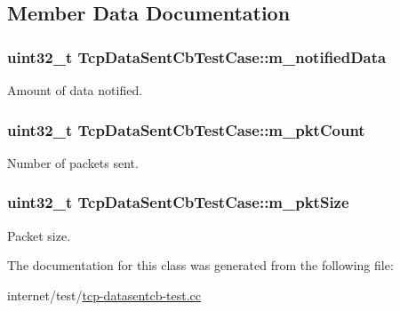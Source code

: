 \subsection{Member Data Documentation}
\subsubsection[{\texorpdfstring{m\+\_\+notified\+Data}{m_notifiedData}}]{\setlength{\rightskip}{0pt plus 5cm}uint32\+\_\+t Tcp\+Data\+Sent\+Cb\+Test\+Case\+::m\+\_\+notified\+Data\hspace{0.3cm}{\ttfamily [private]}}\hypertarget{classTcpDataSentCbTestCase_a681db9a235aa1f24930cb06cffa58366}{}\label{classTcpDataSentCbTestCase_a681db9a235aa1f24930cb06cffa58366}


Amount of data notified. 

\subsubsection[{\texorpdfstring{m\+\_\+pkt\+Count}{m_pktCount}}]{\setlength{\rightskip}{0pt plus 5cm}uint32\+\_\+t Tcp\+Data\+Sent\+Cb\+Test\+Case\+::m\+\_\+pkt\+Count\hspace{0.3cm}{\ttfamily [private]}}\hypertarget{classTcpDataSentCbTestCase_ab001b0a6e03fae5dad33aab37f29b476}{}\label{classTcpDataSentCbTestCase_ab001b0a6e03fae5dad33aab37f29b476}


Number of packets sent. 

\subsubsection[{\texorpdfstring{m\+\_\+pkt\+Size}{m_pktSize}}]{\setlength{\rightskip}{0pt plus 5cm}uint32\+\_\+t Tcp\+Data\+Sent\+Cb\+Test\+Case\+::m\+\_\+pkt\+Size\hspace{0.3cm}{\ttfamily [private]}}\hypertarget{classTcpDataSentCbTestCase_ae9b70582fec8ee23fb78adbba8234da4}{}\label{classTcpDataSentCbTestCase_ae9b70582fec8ee23fb78adbba8234da4}


Packet size. 



The documentation for this class was generated from the following file\+:\begin{DoxyCompactItemize}
\item 
internet/test/\hyperlink{tcp-datasentcb-test_8cc}{tcp-\/datasentcb-\/test.\+cc}\end{DoxyCompactItemize}
